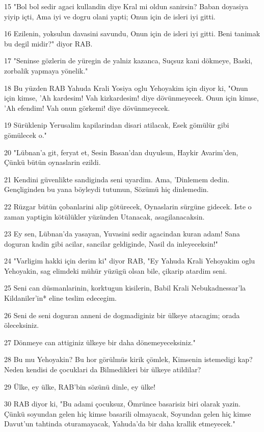 \par 15 "Bol bol sedir agaci kullandin diye Kral mi oldun sanirsin? Baban doyasiya yiyip içti, Ama iyi ve dogru olani yapti; Onun için de isleri iyi gitti.
\par 16 Ezilenin, yoksulun davasini savundu, Onun için de isleri iyi gitti. Beni tanimak bu degil midir?" diyor RAB.
\par 17 "Seninse gözlerin de yüregin de yalniz kazanca, Suçsuz kani dökmeye, Baski, zorbalik yapmaya yönelik."
\par 18 Bu yüzden RAB Yahuda Krali Yosiya oglu Yehoyakim için diyor ki, "Onun için kimse, 'Ah kardesim! Vah kizkardesim! diye dövünmeyecek. Onun için kimse, 'Ah efendim! Vah onun görkemi! diye dövünmeyecek.
\par 19 Sürüklenip Yerusalim kapilarindan disari atilacak, Esek gömülür gibi gömülecek o."
\par 20 "Lübnan'a git, feryat et, Sesin Basan'dan duyulsun, Haykir Avarim'den, Çünkü bütün oynaslarin ezildi.
\par 21 Kendini güvenlikte sandiginda seni uyardim. Ama, 'Dinlemem dedin. Gençliginden bu yana böyleydi tutumun, Sözümü hiç dinlemedin.
\par 22 Rüzgar bütün çobanlarini alip götürecek, Oynaslarin sürgüne gidecek. Iste o zaman yaptigin kötülükler yüzünden Utanacak, asagilanacaksin.
\par 23 Ey sen, Lübnan'da yasayan, Yuvasini sedir agacindan kuran adam! Sana doguran kadin gibi acilar, sancilar geldiginde, Nasil da inleyeceksin!"
\par 24 "Varligim hakki için derim ki" diyor RAB, "Ey Yahuda Krali Yehoyakim oglu Yehoyakin, sag elimdeki mühür yüzügü olsan bile, çikarip atardim seni.
\par 25 Seni can düsmanlarinin, korktugun kisilerin, Babil Krali Nebukadnessar'la Kildaniler'in* eline teslim edecegim.
\par 26 Seni de seni doguran anneni de dogmadiginiz bir ülkeye atacagim; orada öleceksiniz.
\par 27 Dönmeye can attiginiz ülkeye bir daha dönemeyeceksiniz."
\par 28 Bu mu Yehoyakin? Bu hor görülmüs kirik çömlek, Kimsenin istemedigi kap? Neden kendisi de çocuklari da Bilmedikleri bir ülkeye atildilar?
\par 29 Ülke, ey ülke, RAB'bin sözünü dinle, ey ülke!
\par 30 RAB diyor ki, "Bu adami çocuksuz, Ömrünce basarisiz biri olarak yazin. Çünkü soyundan gelen hiç kimse basarili olmayacak, Soyundan gelen hiç kimse Davut'un tahtinda oturamayacak, Yahuda'da bir daha krallik etmeyecek."

